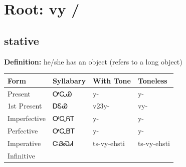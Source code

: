 \documentclass{article}%
\begin{document}
%
\normalsize%
\section*{Root: vy / }%
\subsection*{stative}%
\textbf{Definition: }%
he/she has an object (refers to a long object)%
\\[0.5em]%
\begin{tabular}{|l|l|l|l|}%
\hline%
\textbf{Form}&\textbf{Syllabary}&\textbf{With Tone}&\textbf{Toneless}\\%
\hline%
Present&ᎤᏩᏯ&y{-}&y{-}\\%
1st Present&ᎠᏋᏯ&v23y{-}&vy{-}\\%
Imperfective&ᎤᏩᏲᎢ&y{-}&y{-}\\%
Perfective&ᎤᏩᏴᎢ&y{-}&y{-}\\%
Imperative&ᏨᏰᏍᏗ&ts{-}vy{-}ehsti&ts{-}vy{-}ehsti\\%
Infinitive&&&\\%
\hline%
\end{tabular}%
\\[1em]%
\end{document}
